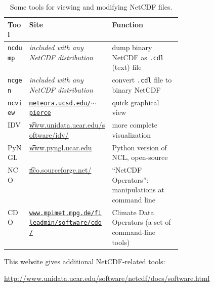 \newcommand{\netcdftool}[1]{#1\index{NetCDF!tools!#1}}
\begin{table}[ht]
\centering
\caption{Some tools for viewing and modifying NetCDF files.}\label{tab:NetCDFview} 
\small
\begin{tabular}{llp{0.4\linewidth}}
  \\\toprule
  \textbf{Tool} & \textbf{Site} & \textbf{Function}\\ \midrule
\netcdftool{\texttt{ncdump}} & \emph{included with any NetCDF distribution} & dump binary NetCDF as \texttt{.cdl} (text) file \\
\netcdftool{\texttt{ncgen}} & \emph{included with any NetCDF distribution} & convert \texttt{.cdl} file to binary NetCDF \\
\netcdftool{\texttt{ncview}} & \href{http://meteora.ucsd.edu/~pierce/ncview_home_page.html}{\texttt{meteora.ucsd.edu/$\sim$pierce}} & quick graphical view \\
\netcdftool{IDV} & \href{http://www.unidata.ucar.edu/software/idv/}{\t{www.unidata.ucar.edu/software/idv/}} & more complete visualization \\
\netcdftool{PyNGL} &  \href{http://www.pyngl.ucar.edu}{\t{www.pyngl.ucar.edu}} & Python version of NCL, open-source\\
\netcdftool{NCO}\index{NCO (NetCDF Operators)} & \href{http://nco.sourceforge.net/}{\t{nco.sourceforge.net/}} & ``NetCDF Operators'': manipulations at command line\\
\netcdftool{CDO} & \href{http://www.mpimet.mpg.de/fileadmin/software/cdo/}{\texttt{www.mpimet.mpg.de/fileadmin/software/cdo/}} & Climate Data Operators (a set of command-line tools)
\\\bottomrule
\end{tabular}
\normalsize
\end{table}

This website gives additional NetCDF-related tools:

\centerline{ \url{http://www.unidata.ucar.edu/software/netcdf/docs/software.html} } 




